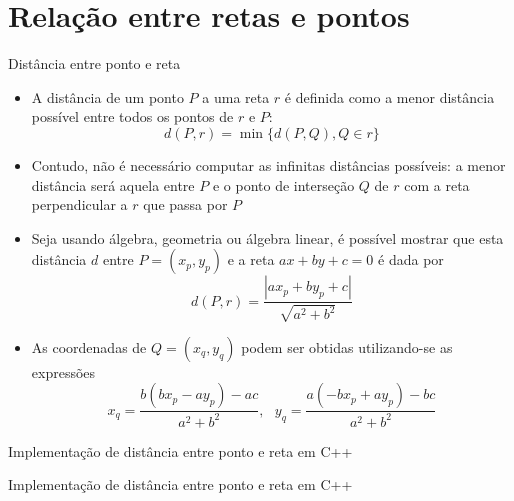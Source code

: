 \section{Relação entre retas e pontos}

\begin{frame}[fragile]{Distância entre ponto e reta}

    \begin{itemize}
        \item A distância de um ponto $P$ a uma reta $r$ é definida como a menor distância possível 
            entre todos os pontos de $r$ e $P$:
        \[
            d(P, r) = \min \lbrace d(P, Q), Q\in r\rbrace
        \]

        \item Contudo, não é necessário computar as infinitas distâncias possíveis: a menor 
            distância será aquela entre $P$ e o ponto de interseção $Q$ de $r$ com a reta 
            perpendicular a $r$ que passa por $P$

        \item Seja usando álgebra, geometria ou álgebra linear, é possível mostrar que esta 
            distância $d$ entre $P = (x_p, y_p)$ e a reta $ax + by + c = 0$ é dada por
        \[
            d(P, r) = \frac{|ax_p + by_p + c|}{\sqrt{a^2 + b^2}}
        \]

        \item As coordenadas de $Q = (x_q, y_q)$ podem ser obtidas utilizando-se as expressões 
        \[
            x_q = \frac{b(bx_p - ay_p) - ac}{a^2 + b^2}, \, \, \, \, y_q = \frac{a(-bx_p + ay_p) - bc}{a^2 + b^2}
        \]
    \end{itemize}

\end{frame}

\begin{frame}[fragile]{Implementação de distância entre ponto e reta em C++}
\end{frame}

\begin{frame}[fragile]{Implementação de distância entre ponto e reta em C++}
\end{frame}

